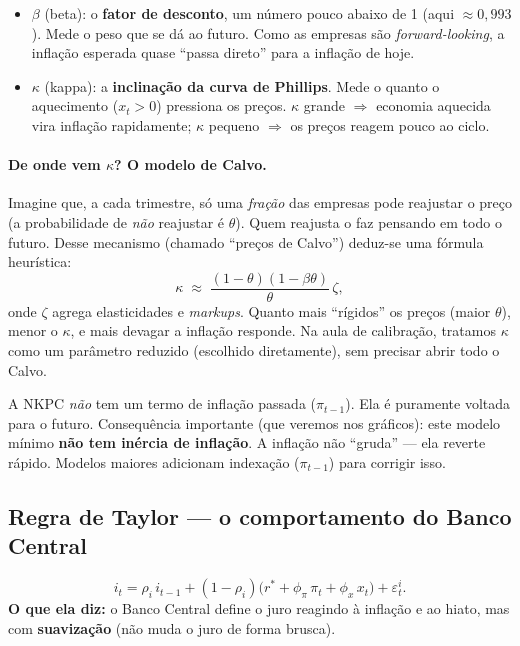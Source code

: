 \documentclass[11pt,a4paper]{article}
\begin{document}
\begin{itemize}[nosep]
  \item $\beta$ (beta): o \textbf{fator de desconto}, um número pouco abaixo de 1 (aqui $\approx
        0{,}993$). Mede o peso que se dá ao futuro. Como as empresas são \emph{forward-looking}, a
        inflação esperada quase ``passa direto'' para a inflação de hoje.
  \item $\kappa$ (kappa): a \textbf{inclinação da curva de Phillips}. Mede o quanto o aquecimento
        ($x_t>0$) pressiona os preços. $\kappa$ grande $\Rightarrow$ economia aquecida vira inflação
        rapidamente; $\kappa$ pequeno $\Rightarrow$ os preços reagem pouco ao ciclo.
\end{itemize}

\paragraph{De onde vem $\kappa$? O modelo de Calvo.} Imagine que, a cada trimestre, só uma
\emph{fração} das empresas pode reajustar o preço (a probabilidade de \emph{não} reajustar é
$\theta$). Quem reajusta o faz pensando em todo o futuro. Desse mecanismo (chamado ``preços de
Calvo'') deduz-se uma fórmula heurística:
\[
\kappa \;\approx\; \frac{(1-\theta)(1-\beta\theta)}{\theta}\,\zeta,
\]
onde $\zeta$ agrega elasticidades e \emph{markups}. Quanto mais ``rígidos'' os preços (maior
$\theta$), menor o $\kappa$, e mais devagar a inflação responde. Na aula de calibração, tratamos
$\kappa$ como um parâmetro reduzido (escolhido diretamente), sem precisar abrir todo o Calvo.

\begin{atencao}
A NKPC \emph{não} tem um termo de inflação passada ($\pi_{t-1}$). Ela é puramente voltada para o
futuro. Consequência importante (que veremos nos gráficos): este modelo mínimo \textbf{não tem inércia
de inflação}. A inflação não ``gruda'' --- ela reverte rápido. Modelos maiores adicionam indexação
($\pi_{t-1}$) para corrigir isso.
\end{atencao}

\subsection{Regra de Taylor --- o comportamento do Banco Central}
\[
i_t = \rho_i\,i_{t-1} + (1-\rho_i)\big(r^\ast + \phi_\pi\,\pi_t + \phi_x\,x_t\big) + \varepsilon^i_t.
\]
\textbf{O que ela diz:} o Banco Central define o juro reagindo à inflação e ao hiato, mas com
\textbf{suavização} (não muda o juro de forma brusca).
\end{document}
